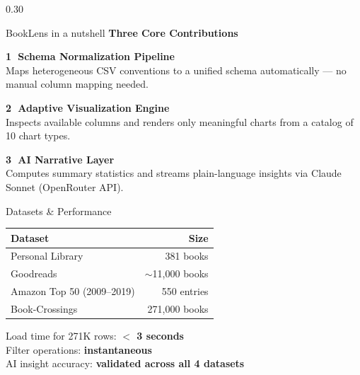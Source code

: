 \documentclass[final]{beamer}
\begin{document}
\begin{frame}[t]{}
\begin{columns}[T,totalwidth=\linewidth]
\begin{column}{0.30\linewidth}
\begin{block}{BookLens in a nutshell}
    \vspace{0.8em}
    \textbf{Three Core Contributions}
    \vspace{0.3em}

    \begin{tcolorbox}[colback=softblue!10,colframe=softblue,
                      arc=3pt,boxrule=1pt,left=6pt]
      \textbf{\textcircled{1} Schema Normalization Pipeline}\\
      Maps heterogeneous CSV conventions to a unified schema
      automatically — no manual column mapping needed.
    \end{tcolorbox}
    \vspace{0.3em}
    \begin{tcolorbox}[colback=softblue!10,colframe=softblue,
                      arc=3pt,boxrule=1pt,left=6pt]
      \textbf{\textcircled{2} Adaptive Visualization Engine}\\
      Inspects available columns and renders only meaningful
      charts from a catalog of 10 chart types.
    \end{tcolorbox}
    \vspace{0.3em}
    \begin{tcolorbox}[colback=softblue!10,colframe=softblue,
                      arc=3pt,boxrule=1pt,left=6pt]
      \textbf{\textcircled{3} AI Narrative Layer}\\
      Computes summary statistics and streams plain-language
      insights via Claude Sonnet (OpenRouter API).
    \end{tcolorbox}
  \end{block}

  \vspace{0.6em}

  \begin{block}{Datasets \& Performance}
    \begin{tabular}{lr}
      \toprule
      \textbf{Dataset} & \textbf{Size} \\
      \midrule
      Personal Library  & 381 books \\
      Goodreads         & $\sim$11,000 books \\
      Amazon Top 50 (2009–2019) & 550 entries \\
      Book-Crossings    & 271,000 books \\
      \bottomrule
    \end{tabular}

    \vspace{0.5em}
    Load time for 271K rows: \textbf{$<$ 3 seconds}\\
    Filter operations: \textbf{instantaneous}\\
    AI insight accuracy: \textbf{validated across all 4 datasets}
  \end{block}


\end{column}
\end{columns}
\end{frame}
\end{document}
